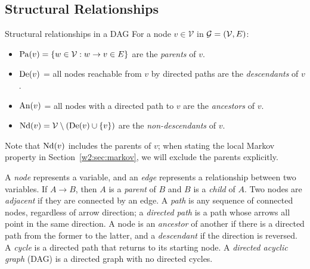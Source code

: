 \documentclass[master.tex]{subfiles}
\begin{document}
\subsection{Structural Relationships}

\begin{defn}{Structural relationships in a DAG}
For a node $v \in \mathcal{V}$ in $\mathcal{G} = (\mathcal{V}, E)$:
\begin{itemize}
  \item $\mathrm{Pa}(v) = \{w \in \mathcal{V} : w \to v \in E\}$ are the \emph{parents} of $v$.
  \item $\mathrm{De}(v)$ = all nodes reachable from $v$ by directed paths
        are the \emph{descendants} of $v$.
  \item $\mathrm{An}(v)$ = all nodes with a directed path to $v$ are the
        \emph{ancestors} of $v$.
  \item $\mathrm{Nd}(v) = \mathcal{V} \setminus (\mathrm{De}(v) \cup \{v\})$ are the
        \emph{non-descendants} of $v$.
\end{itemize}
Note that $\mathrm{Nd}(v)$ includes the parents of $v$; when stating the local
Markov property in Section~\ref{w2:sec:markov}, we will exclude the parents
explicitly.
\end{defn}

\begin{tcolorbox}[defstyle, title={Quick Terminology Summary}]
A \emph{node} represents a variable, and an \emph{edge} represents a
relationship between two variables.
If $A \to B$, then $A$ is a \emph{parent} of $B$ and $B$ is a
\emph{child} of $A$.
Two nodes are \emph{adjacent} if they are connected by an edge.
A \emph{path} is any sequence of connected nodes, regardless of arrow
direction; a \emph{directed path} is a path whose arrows all point in
the same direction.
A node is an \emph{ancestor} of another if there is a directed path from
the former to the latter, and a \emph{descendant} if the direction is
reversed.
A \emph{cycle} is a directed path that returns to its starting node.
A \emph{directed acyclic graph} (DAG) is a directed graph with no
directed cycles.
\end{tcolorbox}
\end{document}
